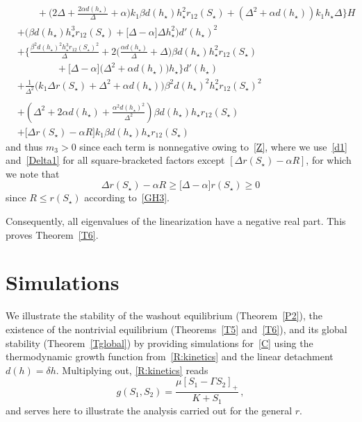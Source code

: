 \documentclass[reqno,11pt]{amsart}
\numberwithin{equation}{section}
\begin{document}
\begin{appendix}
\begin{align*}
&\qquad + \Bigg(2\Delta+\frac{2\alpha d(h_\star)}{\Delta}+\alpha \Bigg) k_1\beta d(h_\star)h_\star^2 r_{12}(S_\star) +\left(\Delta^{2}+\alpha  d(h_\star)\right)  k_1  h_\star\Delta \Bigg\} H\\
& +\Big(\beta  d(h_\star) h_\star^{3} r_{12}(S_\star) +\big[\Delta-\alpha\big]  \Delta h_\star^2  \Big) d'(h_\star)^{2}\\
&+\Bigg\{\frac{\beta^{2} d(h_\star)^{2} h_\star^{3} r_{12}(S_\star)^{2}}{\Delta}+2\Bigg(\frac{\alpha d(h_\star)}{\Delta} +\Delta\Bigg)\beta d(h_\star)h_\star^2 r_{12}(S_\star)\\
&\qquad\qquad +\big[\Delta-\alpha\big]\big(\Delta^2+\alpha d(h_\star)\big)h_\star\Bigg\} d'(h_\star)\\
& +\frac{1}{\Delta^2}\Big( k_1 \Delta   r(S_\star) +\Delta^{2}+\alpha  d(h_\star)\Big) \beta^2  d(h_\star)^2 h_\star^2  r_{12}(S_\star)^{2}\\
&
\\
&+ \left(\Delta^{2}+2\alpha d(h_\star)+\frac{\alpha^2d(h_\star)^2}{\Delta^2}\right)\beta d(h_\star) h_\star r_{12}(S_\star)\\
& +\Big[\Delta r(S_\star)-\alpha R\Big] k_1\beta d(h_\star)h_\star r_{12}(S_\star)
\end{align*}
and thus $m_3>0$ since each term is nonnegative owing to~\eqref{Z}, where we use~\eqref{d1} and~\eqref{Delta1} for all square-bracketed factors except $[\Delta r(S_\star)-\alpha R]$, for which we note that
$$
\Delta r(S_\star)-\alpha R \ge \big[\Delta -\alpha\big] r(S_\star)\ge 0
$$
since $R\le r(S_\star)$ according to~\eqref{GH3}. 
 
Consequently, all eigenvalues of the linearization have a negative real part. This proves Theorem~\ref{T6}.



\section{Simulations}\label{AppN}
We illustrate the stability of the washout equilibrium (Theorem~\ref{P2}), the existence of the nontrivial equilibrium (Theorems~\ref{T5} and~\ref{T6}), and its global stability (Theorem~\ref{Tglobal}) by providing simulations for~\eqref{C} using the thermodynamic growth function from~\eqref{R:kinetics} and the linear detachment $d(h)=\delta h$. Multiplying out, \eqref{R:kinetics} reads 
\[
g(S_1,S_2)=\frac{\mu[S_1-\Gamma S_2]_+}{K+S_1}\, ,
\]
and serves here to illustrate the analysis carried out for the general $r$.


\end{appendix}
\end{document}
